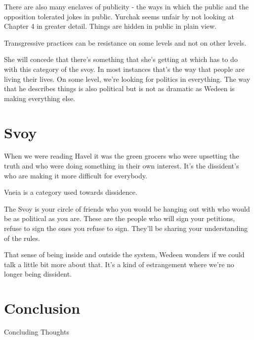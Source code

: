 \documentclass{article}
\begin{document}
\vspace{3mm}

There are also many enclaves of publicity - the ways in which the public and the opposition tolerated jokes in public.  Yurchak seems unfair by not looking at Chapter 4 in greater detail.  Things are hidden in public in plain view.  

\vspace{3mm}

Transgressive practices can be resistance on some levels and not on other levels.  

\vspace{3mm}

She will concede that there's something that she's getting at which has to do with this category of the svoy.  In most instances that's the way that people are living their lives.  On some level, we're looking for politics in everything.  The way that he describes things is also political but is not as dramatic as Wedeen is making everything else.  

\section{Svoy}

When we were reading Havel it was the green grocers who were upsetting the truth and who were doing something in their own interest.  It's the dissident's who are making it more difficult for everybody.  

\vspace{3mm}

Vneia is a category used towards dissidence.  

The Svoy is your circle of friends who you would be hanging out with who would be as political as you are.  These are the people who will sign your petitions, refuse to sign the ones you refuse to sign.  They'll be sharing your understanding of the rules.  

\vspace{3mm}

That sense of being inside and outside the system, Wedeen wonders if we could talk a little bit more about that.  It's a kind of estrangement where we're no longer being dissident.  

\vspace{3mm}




\section{Conclusion}

Concluding Thoughts
\end{document}
